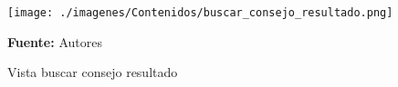 \begin{figure}[!htb]
  \begin{center}
\texttt{[image: ./imagenes/Contenidos/buscar\_consejo\_resultado.png]}
    \caption{Vista buscar consejo resultado}
    \label{fig:Vista_buscar_consejo_resultado}
    \textbf{Fuente:}  Autores
  \end{center}
\end{figure}
